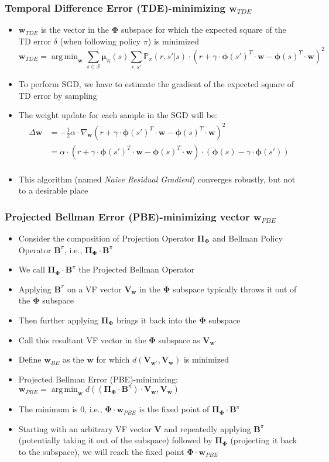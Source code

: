 \documentclass[handout]{beamer}
\DeclareMathOperator*{\argmin}{arg\,min}
\newcommand{\vw}{\bm{V_w}}
\newcommand{\bphi}{\bm{\Phi}}
\newcommand{\bb}{\bm{B}^{\pi}}
\newcommand{\bpi}{\bm{\Pi_{\Phi}}}
\newcommand{\bmu}{\bm{\mu_{\pi}}}
\newcommand{\bv}{\bm{V}}
\newcommand{\bw}{\bm{w}}
\begin{document}
\begin{frame}
\frametitle{Temporal Difference Error (TDE)-minimizing $\bm{w}_{TDE}$}
\pause
\begin{itemize}[<+->]
\item $\bm{w}_{TDE}$ is the vector in the $\bphi$ subspace for which the expected square of the TD error $\delta$ (when following policy $\pi$) is minimized
$$\bm{w}_{TDE} = \argmin_{\bw} \sum_{s \in \mathcal{S}} \bmu(s) \sum_{r,s'} \mathbb{P}_{\pi}(r, s'|s) \cdot (r + \gamma \cdot \bm{\phi}(s')^T \cdot \bw - \bm{\phi}(s)^T \cdot \bw)^2$$
\item To perform SGD, we have to estimate the gradient of the expected square of TD error by sampling
\item The weight update for each sample in the SGD will be:
\begin{align*}
\Delta \bw & = - \frac{1}{2} \alpha \cdot \nabla_{\bw} (r + \gamma \cdot \bm{\phi}(s')^T \cdot \bw - \bm{\phi}(s)^T \cdot \bw)^2\\
& = \alpha \cdot (r + \gamma \cdot \bm{\phi}(s')^T \cdot \bw - \bm{\phi}(s)^T \cdot \bw) \cdot (\bm{\phi}(s) - \gamma \cdot \bm{\phi}(s'))\\
\end{align*}
\item This algorithm (named {\em Naive Residual Gradient}) converges robustly, but not to a desirable place
\end{itemize}
\end{frame}

\begin{frame}
\frametitle{Projected Bellman Error (PBE)-minimizing vector $\bm{w}_{PBE}$}
\pause
\begin{itemize}[<+->]
\item Consider the composition of Projection Operator $\bpi$ and Bellman Policy Operator $\bb$, i.e., $\bpi \cdot \bb$
\item We call $\bpi \cdot \bb$ the Projected Bellman Operator
\item Applying $\bb$ on a VF vector $\vw$ in the $\bphi$ subspace typically throws it out of the $\bphi$ subspace
\item Then further applying $\bpi$ brings it back into the $\bphi$ subspace
\item Call this resultant VF vector in the $\bphi$ subspace as $\bm{V_{w'}}$
\item Define $\bm{w}_{BE}$ as the $\bw$ for which $d(\bm{V_{w'}}, \vw)$ is minimized
\item Projected Bellman Error (PBE)-minimizing: $\bm{w}_{PBE} = \argmin_{\bw} d((\bpi \cdot \bb) \cdot \vw, \vw)$
\item The minimum is 0, i.e., $\bphi \cdot \bm{w}_{PBE}$ is the fixed point of $\bpi \cdot \bb$
\item Starting with an arbitrary VF vector $\bv$ and repeatedly applying $\bb$ (potentially taking it out of the subspace) followed by $\bpi$ (projecting it back to the subspace), we will reach the fixed point $\bphi \cdot \bm{w}_{PBE}$
\end{itemize}
\end{frame}
\end{document}
